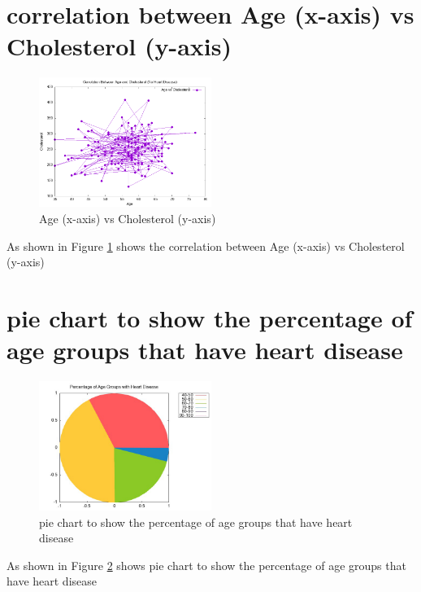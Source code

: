 \documentclass{article}
\begin{document}
\section{correlation between Age (x-axis) vs Cholesterol (y-axis)}
\begin{figure}[H]
\centering
\includegraphics[width=0.5\textwidth]{ques4(c).png}
\caption{Age (x-axis) vs Cholesterol (y-axis)}
\label{fig:image3}
\end{figure}
As shown in Figure \ref{fig:image3} shows the correlation between Age (x-axis) vs Cholesterol (y-axis)
\section{pie chart to show the percentage of age groups that have heart disease}
\begin{figure}[H]
\centering
\includegraphics[width=0.5\textwidth]{ques4(d).png}
\caption{pie chart to show the percentage of age groups that have heart disease}
\label{fig:image4}
\end{figure}
As shown in Figure \ref{fig:image4} shows pie chart to show the percentage of age groups that have heart disease
\end{document}
